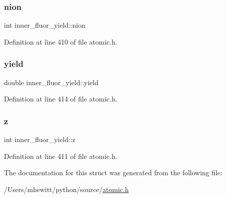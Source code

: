 \mbox{\label{structinner__fluor__yield_a45f9a62a5b21a4684a385d0652a3c0f6}} 
\subsubsection{\texorpdfstring{nion}{nion}}
{\footnotesize\ttfamily int inner\+\_\+fluor\+\_\+yield\+::nion}



Definition at line 410 of file atomic.\+h.

\mbox{\label{structinner__fluor__yield_a0a0200c0d76196864d6288477fe71508}} 
\subsubsection{\texorpdfstring{yield}{yield}}
{\footnotesize\ttfamily double inner\+\_\+fluor\+\_\+yield\+::yield}



Definition at line 414 of file atomic.\+h.

\mbox{\label{structinner__fluor__yield_a59d9eee82a286e387081c5e508114136}} 
\subsubsection{\texorpdfstring{z}{z}}
{\footnotesize\ttfamily int inner\+\_\+fluor\+\_\+yield\+::z}



Definition at line 411 of file atomic.\+h.



The documentation for this struct was generated from the following file\+:\begin{DoxyCompactItemize}
\item 
/\+Users/mhewitt/python/source/\hyperlink{atomic_8h}{atomic.\+h}\end{DoxyCompactItemize}
